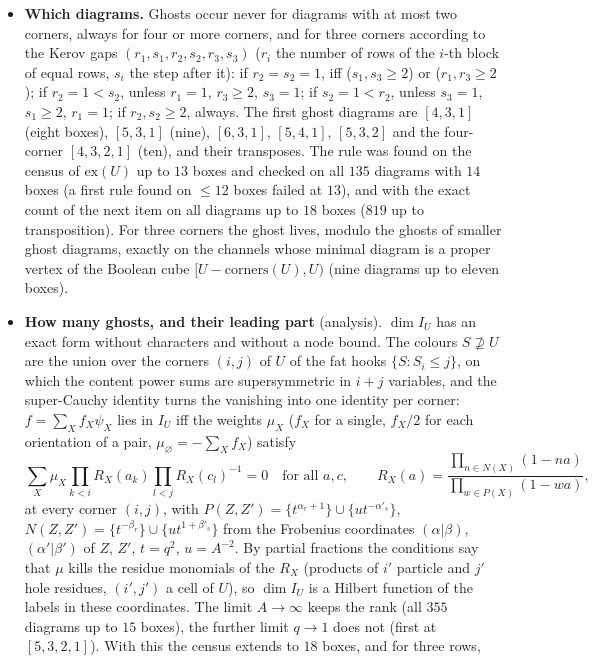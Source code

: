 \documentclass[11pt]{article}
\newcommand{\vac}{\varnothing}
\begin{document}
\begin{itemize}
\item \textbf{Which diagrams.}  Ghosts occur never for diagrams with at most two corners, always for four or more corners,
and for three corners according to the Kerov gaps $(r_1,s_1,r_2,s_2,r_3,s_3)$ ($r_i$ the number of rows of the $i$-th block
of equal rows, $s_i$ the step after it): if $r_2=s_2=1$, iff ($s_1,s_3\ge2$) or ($r_1,r_3\ge2$); if $r_2=1<s_2$, unless
$r_1=1$, $r_3\ge2$, $s_3=1$; if $s_2=1<r_2$, unless $s_3=1$, $s_1\ge2$, $r_1=1$; if $r_2,s_2\ge2$, always.  The first ghost
diagrams are $[4,3,1]$ (eight boxes), $[5,3,1]$ (nine), $[6,3,1]$, $[5,4,1]$, $[5,3,2]$ and the four-corner $[4,3,2,1]$
(ten), and their transposes.  The rule was found on the census of $\mathrm{ex}(U)$ up to $13$ boxes and checked on all $135$
diagrams with $14$ boxes (a first rule found on $\le12$ boxes failed at $13$), and with the exact count of the next item
on all diagrams up to $18$ boxes ($819$ up to transposition).  For three corners the ghost lives, modulo
the ghosts of smaller ghost diagrams, exactly on the channels whose minimal diagram is a proper vertex of the Boolean
cube $[U-\mathrm{corners}(U),U)$ (nine diagrams up to eleven boxes).
\item \textbf{How many ghosts, and their leading part} (analysis).  $\dim I_U$ has an exact form without characters and
without a node bound.  The colours $S\not\supseteq U$ are the union over the corners $(i,j)$ of $U$ of the fat hooks
$\{S:S_i\le j\}$, on which the content power sums are supersymmetric in $i+j$ variables, and the super-Cauchy identity
turns the vanishing into one identity per corner: $f=\sum_Xf_X\psi_X$ lies in $I_U$ iff the weights $\mu_X$ ($f_X$ for a
single, $f_X/2$ for each orientation of a pair, $\mu_\vac=-\sum_Xf_X$) satisfy
\[
\sum_X\mu_X\prod_{k<i}R_X(a_k)\prod_{l<j}R_X(c_l)^{-1}=0\quad\text{for all }a,c,\qquad
R_X(a)=\frac{\prod_{n\in N(X)}(1-na)}{\prod_{w\in P(X)}(1-wa)},
\]
at every corner $(i,j)$, with $P(Z,Z')=\{t^{\alpha_r+1}\}\cup\{ut^{-\alpha'_s}\}$, $N(Z,Z')=\{t^{-\beta_r}\}\cup
\{ut^{1+\beta'_s}\}$ from the Frobenius coordinates $(\alpha|\beta)$, $(\alpha'|\beta')$ of $Z$, $Z'$, $t=q^2$,
$u=A^{-2}$.  By partial fractions the conditions say that $\mu$ kills the residue monomials of the $R_X$ (products of $i'$
particle and $j'$ hole residues, $(i',j')$ a cell of $U$), so $\dim I_U$ is a Hilbert function of the labels in these
coordinates.  The limit $A\to\infty$ keeps the rank (all $355$ diagrams up to $15$ boxes), the further limit $q\to1$
does not (first at $[5,3,2,1]$).  With this the census extends to $18$ boxes, and for three rows,

\end{itemize}
\end{document}
